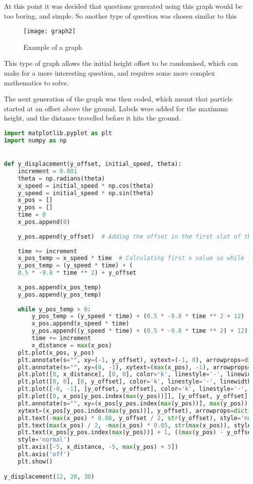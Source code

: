 At this point it was decided that questions generated using this graph would be too boring, and simple. So another type of question was chosen similar to this
\begin{figure}[H]
	\centering
	\texttt{[image: graph2]}
	\caption{Example of a graph \autocite{graph2}}
\end{figure}
This type of graph allows the initial height offset to be randomised, which can make for a more interesting question, and requires some more complex mathematics to solve.

The next generation of the graph was then coded, which meant that particle started at an offset above the ground. Labels were added for the maximum height, and the distance travelled before it hits the ground.
\begin{lstlisting}[language=Python, caption=Second iteration of graph generation]
import matplotlib.pyplot as plt
import numpy as np


def y_displacement(y_offset, initial_speed, theta):
	increment = 0.001
	theta = np.radians(theta)
	x_speed = initial_speed * np.cos(theta)
	y_speed = initial_speed * np.sin(theta)
	x_pos = []
	y_pos = []
	time = 0
	x_pos.append(0)
	
	y_pos.append(y_offset)  # Adding the offset in the first slot of the position array
	
	time += increment
	x_pos_temp = x_speed * time  # Calculating first x value so while loop doesn't fail instantly
	y_pos_temp = (y_speed * time) + (
	0.5 * -9.8 * time ** 2) + y_offset
	
	x_pos.append(x_pos_temp)
	y_pos.append(y_pos_temp)
	
	while y_pos_temp > 0:
		y_pos_temp = (y_speed * time) + (0.5 * -9.8 * time ** 2 + 12)
		x_pos.append(x_speed * time)
		y_pos.append((y_speed * time) + (0.5 * -9.8 * time ** 2) + 12)
		time += increment
		x_distance = max(x_pos)
	plt.plot(x_pos, y_pos)
	plt.annotate(s="", xy=(-1, y_offset), xytext=(-1, 0), arrowprops=dict(arrowstyle='<->'))
	plt.annotate(s="", xy=(0, -1), xytext=(max(x_pos), -1), arrowprops=dict(arrowstyle='<->'))
	plt.plot([0, x_distance], [0, 0], color='k', linestyle='-', linewidth=2)
	plt.plot([0, 0], [0, y_offset], color='k', linestyle='-', linewidth=2)
	plt.plot([-0, -1], [y_offset, y_offset], color='k', linestyle='-', linewidth=2)
	plt.plot([0, x_pos[y_pos.index(max(y_pos))]], [y_offset, y_offset], color='k', linestyle='--', linewidth=2)
	plt.annotate(s="", xy=(x_pos[y_pos.index(max(y_pos))], max(y_pos)),
	xytext=(x_pos[y_pos.index(max(y_pos))], y_offset), arrowprops=dict(arrowstyle='<->'))
	plt.text(-max(x_pos) * 0.08, y_offset / 2, str(y_offset), style='normal')
	plt.text(max(x_pos) / 2, -max(x_pos) * 0.05, str(max(x_pos)), style='normal')
	plt.text(x_pos[y_pos.index(max(y_pos))] + 1, ((max(y_pos) - y_offset) / 2) + y_offset, str(max(y_pos) - y_offset),
	style='normal')
	plt.axis([-5, x_distance, -5, max(y_pos) + 5])
	plt.axis('off')
	plt.show()

y_displacement(12, 20, 30)
\end{lstlisting} 
